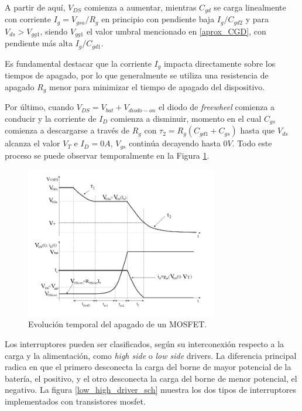 \documentclass[10pt,a4paper]{article}
\begin{document}
A partir de aquí, $V_{DS}$ comienza a aumentar, mientras $C_{gd}$ se carga
linealmente con corriente $I_g=V_{gsa}/R_g$ en principio con pendiente baja
$I_g/C_{gd2}$ y para $V_{ds} > V_{gg1}$, siendo $V_{gg1}$ el valor umbral
mencionado en \ref{aprox_CGD}, con pendiente más alta $I_g/C_{gd1}$.

Es fundamental destacar que la corriente $I_g$ impacta directamente sobre los
tiempos de apagado, por lo que generalmente se utiliza una resistencia de
apagado $R_g$ menor para minimizar el tiempo de apagado del dispositivo.

Por último, cuando $V_{DS} = V_{bat} + V_{diodo-on} $ el diodo de
\emph{freewheel} comienza a conducir y la corriente de $I_D$ comienza a
disminuir, momento en el cual $C_{gs}$ comienza a descargarse a través de $R_g$
con $\tau_2 = R_g (C_{gd1}+C_{gs})$ hasta que $V_{ds}$ alcanza el valor $V_T$ e
$I_D = 0A$, $V_{gs}$ continúa decayendo hasta $0V$. Todo este proceso se puede
observar temporalmente en la Figura \ref{apagado_time}.

\begin{figure}[h!]
	\begin{center}
		\includegraphics[width=0.75\textwidth]{shutdown_time.pdf}
		\caption{Evolución temporal del apagado de un MOSFET.}
		\label{apagado_time}
	\end{center}
\end{figure}
\FloatBarrier

Los interruptores pueden ser clasificados, según su interconexión respecto a la
carga y la alimentación, como \emph{high side} o \emph{low side} drivers. 
La diferencia principal radica en que el primero desconecta la
carga del borne de mayor potencial de la batería, el positivo, y el otro
desconecta la carga del borne de menor potencial, el negativo. La figura
\ref{low_high_driver_sch} muestra los dos tipos de interruptores implementados
con transistores mosfet.
\end{document}

